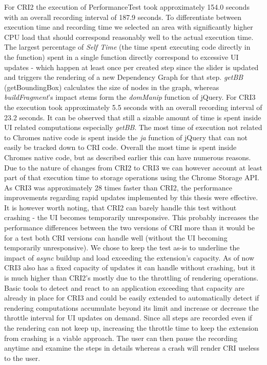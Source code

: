 	For CRI2 the execution of PerformanceTest took approximately 154.0 seconds with an overall recording interval of 187.9 seconds. To differentiate between execution time and recording time we selected an area with significantly higher CPU load that should correspond reasonably well to the actual execution time. The largest percentage of \emph{Self Time} (the time spent executing code directly in the function) spent in a single function directly correspond to excessive UI updates - which happen at least once per created step since the slider is updated and triggers the rendering of a new Dependency Graph for that step. \emph{getBB} (getBoundingBox) calculates the size of nodes in the graph, whereas  \emph{buildFragment}'s impact stems form the \emph{domManip} function of jQuery.
	For CRI3 the execution took approximately 5.5 seconds with an overall recording interval of 23.2 seconds. It can be observed that still a sizable amount of time is spent inside UI related computations especially \emph{getBB}. The most time of execution not related to Chromes native code is spent inside the \emph{ja} function of jQuery that can not easily be tracked down to CRI code. Overall the most time is spent inside Chromes native code, but as described earlier this can have numerous reasons. Due to the nature of changes from CRI2 to CRI3 we can however account at least part of that execution time to storage operations using the Chrome Storage API. 
	As CRI3 was approximately 28 times faster than CRI2, the performance improvements regarding rapid updates implemented by this thesis were effective. It is however worth noting, that CRI2 can barely handle this test without crashing - the UI becomes temporarily unresponsive. This probably increases the performance differences between the two versions of CRI more than it would be for a test both CRI versions can handle well (without the UI becoming temporarily unresponsive). We chose to keep the test as-is to underline the impact of \emph{async} buildup and load exceeding the extension's capacity. 
	As of now CRI3 also has a fixed capacity of updates it can handle without crashing, but it is much higher than CRI2's mostly due to the throttling of rendering operations. Basic tools to detect and react to an application exceeding that capacity are already in place for CRI3 and could be easily extended to automatically detect if rendering computations accumulate beyond its limit and increase or decrease the throttle interval for UI updates on demand. Since all steps are recorded even if the rendering can not keep up, increasing the throttle time to keep the extension from crashing is a viable approach. The user can then pause the recording anytime and examine the steps in details whereas a crash will render CRI useless to the user.
	
